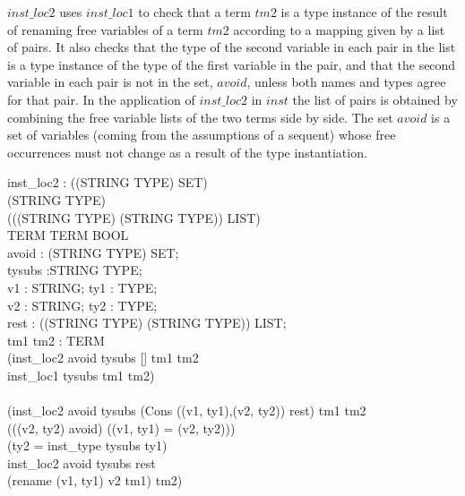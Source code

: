 \documentclass[a4paper,11pt,titlepage]{article}
\begin{document}
\begin{titlepage}
$inst\_loc2$ uses $inst\_loc1$ to check that a term $tm2$
is a type instance of the result of renaming free
variables of a term $tm2$ according to a mapping
given by a list of pairs. It also checks that
the type of the second variable in each pair in the list
is a type instance of the type of the first variable
in the pair,
and that the second variable in each pair
is not in the set, $avoid$, unless both names and types
agree for that pair.
In the application of $inst\_loc2$ in $inst$ the list
of pairs is obtained by combining the free variable lists
of the two terms side by side.
The set $avoid$ is a set of variables (coming from
the assumptions of a sequent) whose free occurrences
must not change as a result of the type instantiation.
\begin{HOLConst}
\+	\PrNL{}inst\_loc2\PrNN{} : ((STRING \MMM{\times} TYPE) SET) \MMM{\rightarrow}\\
\+		(STRING \MMM{\rightarrow} TYPE) \MMM{\rightarrow}\\
\+		(((STRING \MMM{\times} TYPE) \MMM{\times} (STRING \MMM{\times} TYPE)) LIST) \MMM{\rightarrow}\\
\+		TERM \MMM{\rightarrow} TERM \MMM{\rightarrow} BOOL\\
\PrPH{}
\+	\MMM{\forall}avoid : (STRING \MMM{\times} TYPE) SET;\\
\+	tysubs :STRING \MMM{\rightarrow} TYPE;\\
\+	v1 : STRING; ty1 : TYPE;\\
\+	v2 : STRING; ty2 : TYPE;\\
\+	rest : ((STRING \MMM{\times} TYPE) \MMM{\times} (STRING \MMM{\times} TYPE)) LIST;\\
\+	tm1 tm2 : TERM\MMM{\bullet}\\
\+	(inst\_loc2 avoid tysubs [] tm1 tm2 \MMM{\Leftrightarrow}\\
\+		inst\_loc1 tysubs tm1 tm2)\\
\+	\MMM{\land}\\
\+	(inst\_loc2 avoid tysubs (Cons ((v1, ty1),(v2, ty2)) rest) tm1 tm2 \MMM{\Leftrightarrow}\\
\+		(((v2, ty2) \MMM{\in} avoid) \MMM{\Rightarrow} ((v1, ty1) = (v2, ty2)))\\
\+	\MMM{\land}	(ty2 = inst\_type tysubs ty1)\\
\+	\MMM{\land}	inst\_loc2 avoid tysubs rest\\
\+		(rename (v1, ty1) v2 tm1) tm2)\\
\end{HOLConst}



\end{titlepage}
\end{document}
